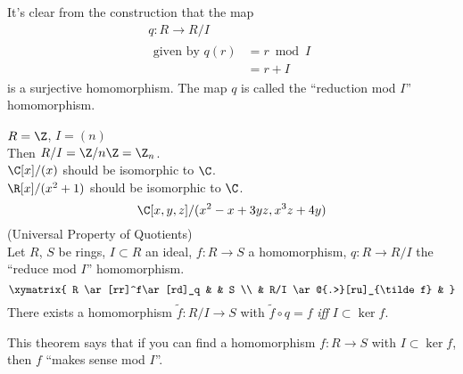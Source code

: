 It's clear from the construction that the map
\begin{gather*}
q \colon R \to R/I \\
\begin{aligned}
\text{given by } q(r) &= r \bmod I \\
&= r + I
\end{aligned}
\end{gather*}
is a surjective homomorphism.  The map $q$ is called the ``reduction mod $I$'' homomorphism.

\eg $R=\Z$, $I=(n)$ \\
Then $R/I=\Z/n\Z=\Z_n$. \\
\eg $\C[x]/(x)$ should be isomorphic to $\C$. \\
\eg $\R[x]/(x^2+1)$ should be isomorphic to $\C$.%
%
\[ \C[x,y,z]/(x^2-x+3yz,x^3z+4y) \]
%
\thm (Universal Property of Quotients) \\
Let $R$, $S$ be rings, $I\subset R$ an ideal, $f\colon R\to S$ a homomorphism, $q\colon R\to R/I$ the ``reduce mod $I$'' homomorphism.
\[ \xymatrix{
R \ar[rr]^f\ar[rd]_q &   & S \\
 & R/I \ar@{.>}[ru]_{\tilde f} &
} \]
There exists a homomorphism $\tilde f\colon R/I\to S$ with $\tilde f\circ q=f$ \emph{iff} $I\subset\ker f$.

\remark This theorem says that if you can find a homomorphism $f\colon R\to S$ with $I\subset\ker f$, then $f$ ``makes sense mod $I$''.
